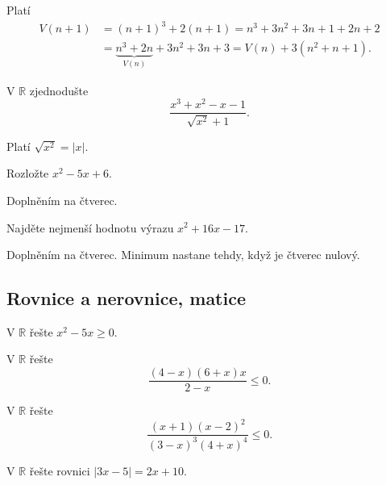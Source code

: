 \begin{reseni}
 Platí
 \begin{align*}
   V(n+1) &= (n+1)^3 + 2(n+1) = n^3 + 3n^2 + 3n + 1+ 2n +2 \\
   & = \underbrace{n^3+ 2n}_{V(n)} + 3n^2 + 3n + 3 = V(n) + 3(n^2+n+1).
 \end{align*}
\end{reseni}

\begin{priklad}
V $\mathbb R$ zjednodušte
$$\frac{x^3+x^2-x-1}{\sqrt{x^2}+1 }.$$
\end{priklad}

\begin{reseni}
Platí $\sqrt{x^2}=|x| $.
\end{reseni}

\begin{priklad}
Rozložte $x^2-5x+6$.
\end{priklad}

\begin{reseni}
Doplněním na čtverec.
\end{reseni}

\begin{priklad}
Najděte nejmenší hodnotu výrazu $x^2+16x-17.$
\end{priklad}

\begin{reseni}
Doplněním na čtverec. Minimum nastane tehdy, když je čtverec nulový.
\end{reseni}


\subsection{Rovnice a nerovnice, matice}
\begin{priklad}
    V $\mathbb R$ řešte $x^2-5x \geq 0.$
\end{priklad}

\begin{priklad}
V $\mathbb R$ řešte
$$\frac{(4-x)(6+x)x}{2-x}\leq 0.$$
\end{priklad}

\begin{priklad}
V $\mathbb R$ řešte $$\frac{(x+1)(x-2)^2}{(3-x)^3(4+x)^4}\leq 0.$$
\end{priklad}

\begin{priklad}
V $\mathbb R$ řešte rovnici $|3x-5|=2x+10.$
\end{priklad}


